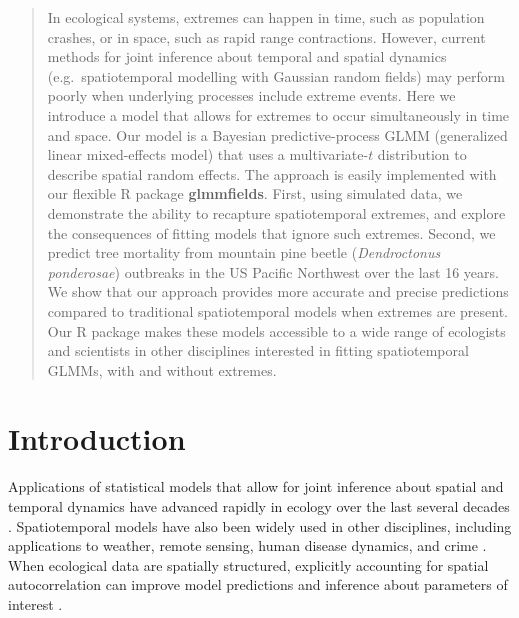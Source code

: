 \documentclass[12pt,english]{article}
\begin{document}
\begin{spacing}{1.8}
\linenumbers




\begin{abstract}

In ecological systems, extremes can happen
in time, such as population crashes,
or in space, such as rapid range contractions.
However, current methods for
joint inference about temporal and spatial dynamics
(e.g.\ spatiotemporal modelling with Gaussian random fields)
may perform poorly when
underlying processes include extreme events.
Here we introduce a model that allows for extremes
to occur simultaneously in time and space.
Our model is a Bayesian predictive-process GLMM
(generalized linear mixed-effects model)
that uses a multivariate-$t$ distribution to describe spatial random effects.
The approach is easily implemented with
our flexible R package \textbf{glmmfields}.
First, using simulated data,
we demonstrate the ability to recapture spatiotemporal extremes,
and explore the consequences of fitting models that ignore such extremes.
Second, we predict
tree mortality from mountain pine beetle (\emph{Dendroctonus ponderosae})
outbreaks in the US Pacific Northwest over the last 16 years.
We show that our approach provides
more accurate and precise predictions
compared to traditional spatiotemporal models
when extremes are present.
Our R package makes these models
accessible to a wide range of ecologists
and scientists in other disciplines interested in
fitting spatiotemporal GLMMs, with and without extremes.
\end{abstract}

%
%

\section{Introduction}

Applications of statistical models that allow for joint inference about spatial
and temporal dynamics have advanced rapidly in ecology over the last several
decades \citep[e.g.][]{bascompte1995, latimer2009, conn2015}. Spatiotemporal
models have also been widely used in other disciplines, including applications
to weather, remote sensing, human disease dynamics, and crime
\citep{cressie2011}. When ecological data are spatially structured, explicitly
accounting for spatial autocorrelation can improve model predictions and
inference about parameters of interest \citep[e.g.][]{shelton2014, thorson2015}.


\end{spacing}
\end{document}
